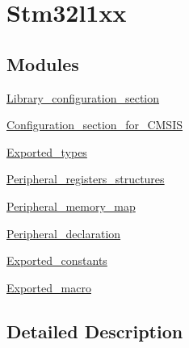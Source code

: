\hypertarget{group__stm32l1xx}{\section{Stm32l1xx}
\label{group__stm32l1xx}
}
\subsection*{Modules}
\begin{DoxyCompactItemize}
\item 
\hyperlink{group___library__configuration__section}{Library\-\_\-configuration\-\_\-section}
\item 
\hyperlink{group___configuration__section__for___c_m_s_i_s}{Configuration\-\_\-section\-\_\-for\-\_\-\-C\-M\-S\-I\-S}
\item 
\hyperlink{group___exported__types}{Exported\-\_\-types}
\item 
\hyperlink{group___peripheral__registers__structures}{Peripheral\-\_\-registers\-\_\-structures}
\item 
\hyperlink{group___peripheral__memory__map}{Peripheral\-\_\-memory\-\_\-map}
\item 
\hyperlink{group___peripheral__declaration}{Peripheral\-\_\-declaration}
\item 
\hyperlink{group___exported__constants}{Exported\-\_\-constants}
\item 
\hyperlink{group___exported__macro}{Exported\-\_\-macro}
\end{DoxyCompactItemize}


\subsection{Detailed Description}
